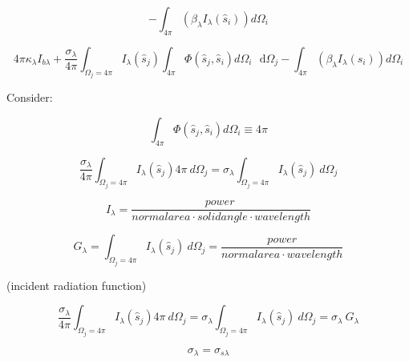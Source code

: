 \documentclass[12pt]{article}
\renewcommand{\_}{\kern-1.5pt\textunderscore\kern-1.5pt}
\begin{document}
 \[ - \int _{4 \pi }^{} \left(  \beta _{ \lambda }I_{ \lambda } \left( \hat{s}_{i} \right)  \right) d \Omega _{i} \] \par


\vspace{\baselineskip}
\par

 \[ 4 \pi  \kappa _{ \lambda }I_{b \lambda }+\frac{ \sigma _{ \lambda }}{4 \pi } \int _{ \Omega _{j}=4 \pi }^{}I_{ \lambda } \left( \hat{s}_{j} \right)  \int _{4 \pi }^{} \Phi  \left( \hat{s}_{j},\hat{s}_{i} \right) d \Omega _{i}\text{~ d} \Omega _{j}- \int _{4 \pi }^{} \left(  \beta _{ \lambda }I_{ \lambda } \left( \hat{s}_{i} \right)  \right) d \Omega _{i} \] \par


\vspace{\baselineskip}
Consider: \par

 \[  \int _{4 \pi }^{} \Phi  \left( \hat{s}_{j},\hat{s}_{i} \right) d \Omega _{i} \equiv 4 \pi  \] \par

 \[ \frac{ \sigma _{ \lambda }}{4 \pi } \int _{ \Omega _{j}=4 \pi }^{}I_{ \lambda } \left( \hat{s}_{j} \right) 4 \pi ~ d \Omega _{j}= \sigma _{ \lambda } \int _{ \Omega _{j}=4 \pi }^{}I_{ \lambda } \left( \hat{s}_{j} \right) ~d \Omega _{j} \] \par

\par

 \[ I_{ \lambda }=\frac{power~}{normal area \cdot solid angle \cdot wavelength} \] \par

 \[ G_{ \lambda }= \int _{ \Omega _{j}=4 \pi }^{}I_{ \lambda } \left( \hat{s}_{j} \right) ~d \Omega _{j} =\frac{power}{normal area \cdot wavelength} \] \par

\par

(incident radiation function)\par

 \[ \frac{ \sigma _{ \lambda }}{4 \pi } \int _{ \Omega _{j}=4 \pi }^{}I_{ \lambda } \left( \hat{s}_{j} \right) 4 \pi ~ d \Omega _{j}= \sigma _{ \lambda } \int _{ \Omega _{j}=4 \pi }^{}I_{ \lambda } \left( \hat{s}_{j} \right) ~d \Omega _{j}= \sigma _{ \lambda }~G_{ \lambda } \] \par

 \[  \sigma _{ \lambda }= \sigma _{s \lambda } \] \par
\end{document}
